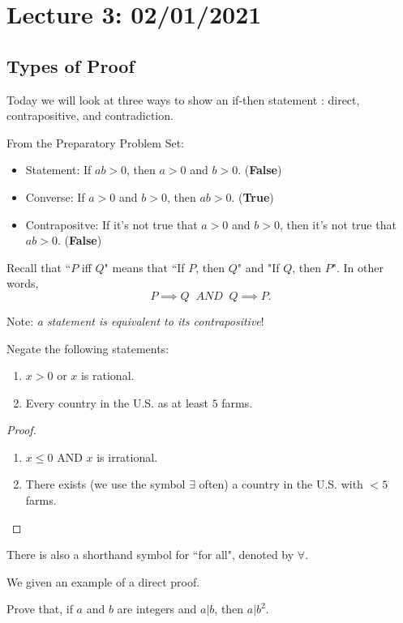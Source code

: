 \section{Lecture 3: 02/01/2021}

\subsection{Types of Proof}
Today we will look at three ways to show an if-then statement : direct, contrapositive, and contradiction.
\smallbreak

From the Preparatory Problem Set:
\begin{itemize}
    \item Statement: If $ab > 0$, then $a > 0$ and $b > 0$. (\textbf{False})
    \item Converse: If $a > 0$ and $b > 0$, then $ab > 0$. (\textbf{True})
    \item Contrapositve: If it's not true that $a > 0$ and $b > 0$, then it's not true that $ab > 0$. (\textbf{False})
\end{itemize}

Recall that ``$P$ iff $Q$" means that ``If $P$, then $Q$" and "If $Q$, then $P$". In other words,
\[
P \implies Q \; \; AND \; \; Q \implies P.
\]

Note: \textit{a statement is equivalent to its contrapositive}!

\begin{example}
Negate the following statements:
\begin{enumerate}
    \item $x > 0$ or $x$ is rational.
    \item Every country in the U.S. as at least $5$ farms.
\end{enumerate}
\end{example}

\begin{proof}\quad
\begin{enumerate}
    \item $x \le 0$ AND $x$ is irrational.
    \item There exists (we use the symbol $\exists$ often) a country in the U.S. with $< 5$ farms.
\end{enumerate}
\end{proof}

There is also a shorthand symbol for ``for all", denoted by $\forall$.

We given an example of a direct proof. 
\begin{example}
Prove that, if $a$ and $b$ are integers and $a | b$, then $a | b^2$.
\end{example}

